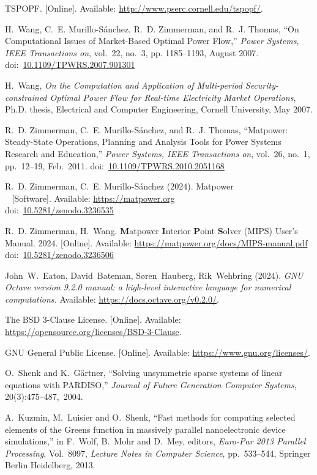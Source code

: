 \documentclass[12pt]{article}
\newcommand{\matpower}[0]{{\sc Matpower}}
\newcommand{\mips}[0]{{MIPS}}
\newcommand{\mipsname}[0]{{{\bf M}{\sc atpower} \textbf{I}nterior \textbf{P}oint \textbf{S}olver}}
\newcommand{\doi}[1]{doi:~\href{https://doi.org/#1}{#1}}
\numberwithin{equation}{section}
\numberwithin{table}{section}
\numberwithin{figure}{section}
\begin{document}
\clearpage
\begin{thebibliography}{99}
TSPOPF. [Online]. Available: \url{http://www.pserc.cornell.edu/tspopf/}.

H.~Wang, C.~E. Murillo-S{\'a}nchez, R.~D. Zimmerman, and R.~J. Thomas, ``On
Computational Issues of Market-Based Optimal Power Flow,'' \emph{Power
Systems, IEEE Transactions on}, vol.~22, no.~3, pp. 1185--1193, August 2007.
\doi{10.1109/TPWRS.2007.901301}

H.~Wang, \emph{On the Computation and Application of Multi-period Security-constrained Optimal Power Flow for Real-time Electricity Market Operations}, Ph.D. thesis, Electrical and Computer Engineering, Cornell University, May 2007.

R.~D. Zimmerman, C.~E. Murillo-S{\'a}nchez, and R.~J. Thomas, ``\matpower{}: Steady-State Operations, Planning and Analysis Tools for Power Systems Research and Education,'' \emph{Power Systems, IEEE Transactions on}, vol.~26, no.~1, pp.~12--19, Feb.~2011.
\doi{10.1109/TPWRS.2010.2051168}

R.~D. Zimmerman, C.~E. Murillo-S{\'a}nchez (2024). \matpower{}\\~
[Software]. Available: \url{https://matpower.org}\\
\doi{10.5281/zenodo.3236535}

R.~D. Zimmerman, H.~Wang. \mipsname{} (\mips{}) User's Manual. 2024.
[Online]. Available: \url{https://matpower.org/docs/MIPS-manual.pdf}\\
\doi{10.5281/zenodo.3236506}

John~W.~Eaton, David~Bateman, S{\o}ren~Hauberg, Rik~Wehbring (2024). \emph{GNU Octave version 9.2.0 manual: a high-level interactive language for numerical computations.} Available: \url{https://docs.octave.org/v0.2.0/}.

The BSD 3-Clause License. [Online]. Available: \url{https://opensource.org/licenses/BSD-3-Clause}.

GNU General Public License. [Online]. Available: \url{https://www.gnu.org/licenses/}.

O.~Shenk and K.~G\"artner, ``Solving unsymmetric sparse systems of linear equations with PARDISO,'' \emph{Journal of Future Generation Computer Systems}, 20(3):475--487,~2004.

A.~Kuzmin, M.~Luisier and O.~Shenk, ``Fast methods for computing selected elements of the Greens function in massively parallel nanoelectronic device simulations,'' in F.~Wolf, B.~Mohr and D.~Mey, editors, \emph{Euro-Par 2013 Parallel Processing}, Vol.~8097, \emph{Lecture Notes in Computer Science}, pp.~533--544, Springer Berlin Heidelberg, 2013.

\end{thebibliography}
\end{document}
